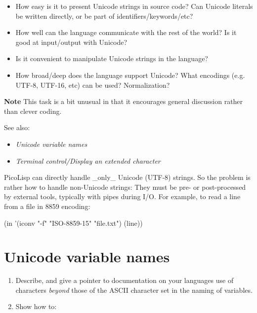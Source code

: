 \begin{itemize}
\item
  How easy is it to present Unicode strings in source code? Can Unicode
  literals be written directly, or be part of identifiers/keywords/etc?
\item
  How well can the language communicate with the rest of the world? Is
  it good at input/output with Unicode?
\item
  Is it convenient to manipulate Unicode strings in the language?
\item
  How broad/deep does the language support Unicode? What encodings (e.g.
  UTF-8, UTF-16, etc) can be used? Normalization?
\end{itemize}

\textbf{Note} This task is a bit unusual in that it encourages general
discussion rather than clever coding.

See also:

\begin{itemize}
\item \emph{Unicode variable names}
\item \emph{Terminal control/Display an extended character}
\end{itemize}



\begin{wideverbatim}

PicoLisp can directly handle _only_ Unicode (UTF-8) strings. So the problem is
rather how to handle non-Unicode strings: They must be pre- or post-processed by
external tools, typically with pipes during I/O. For example, to read a line
from a file in 8859 encoding:

   (in '(iconv "-f" "ISO-8859-15" "file.txt") (line))

\end{wideverbatim}

\pagebreak{}
\section*{Unicode variable names}

\begin{enumerate}
\item
  Describe, and give a pointer to documentation on your languages use of
  characters \emph{beyond} those of the ASCII character set in the
  naming of variables.
\item
  Show how to:
\end{enumerate}

